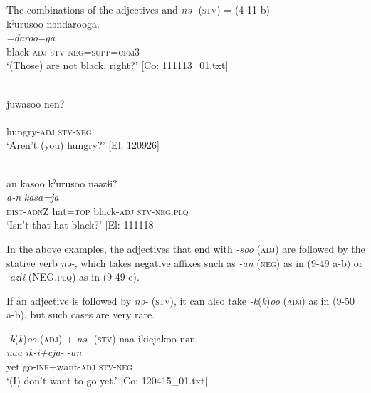 \ea   The combinations of the adjectives and \textit{nə-} (\textsc{stv}) \label{ex:9.49}
  \ea{} = (4-11 b)\\
    \glll  kˀurusoo  nəndarooga.\\
      \textit{}  \textit{=daroo=ga}\\
      black-\textsc{adj}  \textsc{stv}-\textsc{neg}=\textsc{supp}=\textsc{cfm}3\\
      \glt       ‘(Those) are not black, right?’ [Co: 111113\_01.txt]

\ex\relax [= (4-50 d)]\\
    \glll  juwasoo  nən?\\
      \textit{}  \textit{}\\
      hungry-\textsc{adj}  \textsc{stv}-\textsc{neg}\\
      \glt       ‘Aren’t (you) hungry?’ [El: 120926]

\ex\relax [= (8-49 b)]\\
    \glll  an  kasoo  kˀurusoo  nəəzɨi?\\
      \textit{a-n}  \textit{kasa=ja}  \textit{}  \textit{}\\
      \textsc{dist}-\textsc{adn}Z  hat=\textsc{top}  black-\textsc{adj}  \textsc{stv}-\textsc{neg}.\textsc{plq}\\
      \glt       ‘Isn’t that hat black?’ [El: 111118]
    \z
\z

In the above examples, the adjectives that end with \textit{{}-soo} (\textsc{adj}) are followed by the stative verb \textit{nə-}, which takes negative affixes such as \textit{{}-an} (\textsc{neg}) as in (9-49 a-b) or \textit{{}-azɨi} (NEG.\textsc{plq}) as in (9-49 c).

If an adjective is followed by \textit{nə-} (\textsc{stv}), it can also take \textit{{}-k}(\textit{k})\textit{oo} (\textsc{adj}) as in (9-50 a-b), but such cases are very rare.

\ea   \textit{{}-k}(\textit{k})\textit{oo} (\textsc{adj}) + \textit{nə-} (\textsc{stv}) \label{ex:9.50}
\ea %
 \glll  naa  ikicjakoo  nən.\\
      \textit{naa}  \textit{ik-i+cja-}  \textit{-an}\\
      yet  go-\textsc{inf}+want-\textsc{adj}  \textsc{stv}-\textsc{neg}\\
      \glt       ‘(I) don’t want to go yet.’ [Co: 120415\_01.txt]

